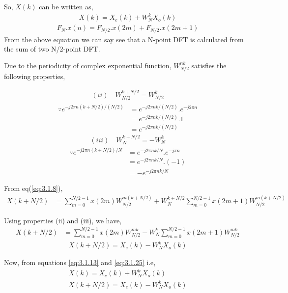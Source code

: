 \documentclass[journal,12pt,twocolumn]{IEEEtran}
\renewcommand\thesection{\arabic{section}}
\begin{document}
\begin{enumerate}[label=\thesection.\arabic*.,ref=\thesection.\theenumi]
So, $X(k)$ can be written as,
\begin{align}
    X(k) = X_{e}(k) + W_{N}^k X_{o}(k) \label{eq:3.1.13}
\end{align}
\begin{align}
    F_{N}.x(n) = F_{N/2}.x(2m) + F_{N/2}.x(2m+1) 
\end{align}
From the above equation we can say see that a N-point DFT is calculated from the sum of two N/2-point DFT.

\bigskip
Due to the periodicity of complex exponential function, $W_{N/2}^{nk}$ satisfies the following properties,

\begin{align}
  (ii) \quad W^{k+N/2}_{N/2} = W^{k}_{N/2}
\end{align}
\begin{align}
    \because e^{-j2\pi n(k+N/2)/(N/2)} &= e^{-j2\pi nk/(N/2)}.e^{-j2\pi n} \\
    &= e^{-j2\pi nk/(N/2)}.1 \\
    &= e^{-j2\pi nk/(N/2)}
\end{align}
\begin{align}
  (iii)\quad  W^{k+N/2}_{N} = -W^{k}_{N}\end{align}
\begin{align}
    \because e^{-j2\pi n(k+N/2)/N} &= e^{-j2\pi nk/N}.e^{-j\pi n} \\
    &= e^{-j2\pi nk/N}.(-1) \\
    &= -e^{-j2\pi nk/N}
\end{align}

\newpage
From eq(\eqref{eq:3.1.8}),
\begin{align}
    X(k+N/2) &= \sum_{m=0}^{{N/2}-1} x(2m)W^{m(k+N/2)}_{N/2} +W^{k+N/2}_{N} \sum_{m=0}^{{N/2}-1} x(2m+1)W^{m(k+N/2)}_{N/2}
\end{align}

Using properties (ii) and (iii), we have,
\begin{align}
    X(k+N/2) &= \sum_{m=0}^{{N/2}-1} x(2m)W^{mk}_{N/2} - W^{k}_{N} \sum_{m=0}^{{N/2}-1} x(2m+1)W^{mk}_{N/2} 
\end{align}
\begin{align}
    X(k+N/2) = X_{e}(k) - W_{N}^k X_{o}(k) \label{eq:3.1.25}
\end{align}

Now, from equations \eqref{eq:3.1.13} and \eqref{eq:3.1.25} i.e,
\begin{align}
    X(k) = X_{e}(k) + W_{N}^k X_{o}(k) \\
    X(k+N/2) = X_{e}(k) - W_{N}^k X_{o}(k) 
\end{align}


\end{enumerate}
\end{document}
